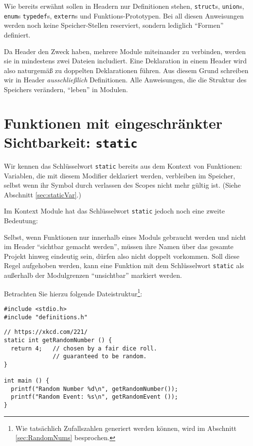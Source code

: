 \begin{warnbox}
Wie bereits erwähnt sollen in Headern nur Definitionen stehen, \ie \texttt{struct}s, \texttt{union}s, \texttt{enum}s \texttt{typedef}s, \texttt{extern}s und Funktions-Prototypen. Bei all diesen Anweisungen werden noch keine Speicher-Stellen reserviert, sondern lediglich \enquote{Formen} definiert.

Da Header den Zweck haben, mehrere Module miteinander zu verbinden, werden sie in mindestens zwei Dateien includiert. Eine Deklaration in einem Header wird also naturgemäß zu doppelten Deklarationen führen. Aus diesem Grund schreiben wir in Header \emph{ausschließlich} Definitionen. Alle Anweisungen, die die Struktur des Speichers verändern, \enquote{leben} in Modulen.
\end{warnbox}

\section{Funktionen mit eingeschränkter Sichtbarkeit: \texttt{static}}
Wir kennen das Schlüsselwort \texttt{static} bereits aus dem Kontext von Funktionen: Variablen, die mit diesem Modifier deklariert werden, verbleiben im Speicher, selbst wenn ihr Symbol durch verlassen des Scopes nicht mehr gültig ist. (Siehe Abschnitt \ref{sec:staticVar}.)

Im Kontext Module hat das Schlüsselwort \texttt{static} jedoch noch eine zweite Bedeutung:

Selbst, wenn Funktionen nur innerhalb eines Moduls gebraucht werden und nicht im Header \enquote{sichtbar gemacht werden}, müssen ihre Namen über das gesamte Projekt hinweg eindeutig sein, dürfen also nicht doppelt vorkommen. Soll diese Regel aufgehoben werden, kann eine Funktion mit dem Schlüsselwort \texttt{static} als außerhalb der Modulgrenzen \enquote{unsichtbar} markiert werden.

Betrachten Sie hierzu folgende Dateistruktur\footnote{Wie tatsächlich Zufallszahlen generiert werden können, wird im Abschnitt \ref{sec:RandomNums} besprochen.}:

\begin{codebox}
\begin{verbatim}
#include <stdio.h>
#include "definitions.h"
\end{verbatim}
\end{codebox}
%
\begin{codebox}[]
\begin{verbatim}
// https://xkcd.com/221/
static int getRandomNumber () {
  return 4;   // chosen by a fair dice roll.
              // guaranteed to be random.
}

int main () {
  printf("Random Number %d\n", getRandomNumber());
  printf("Random Event: %s\n", getRandomEvent ());
}
\end{verbatim}
\end{codebox}


